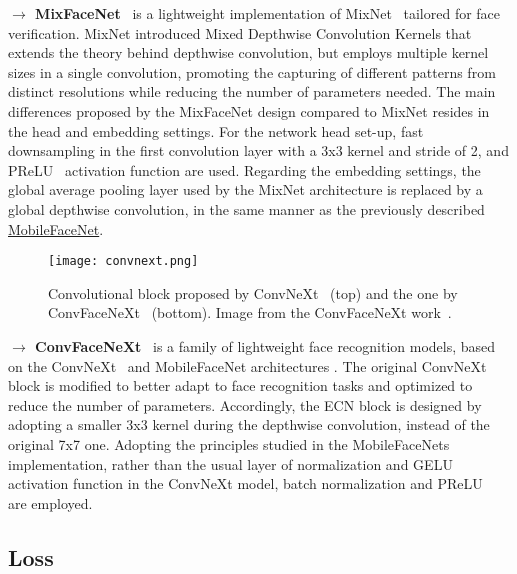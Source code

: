 \documentclass[class=report, crop=false, a4paper, 12pt]{standalone}
\begin{document}
\noindent\textbf{$\rightarrow$ MixFaceNet}~\autocite{boutrosMixFaceNetsExtremelyEfficient2021} is a lightweight implementation of MixNet~\autocite{tanMixConvMixedDepthwise} tailored for face verification. MixNet introduced Mixed Depthwise Convolution Kernels  that extends the theory behind depthwise convolution, but employs multiple kernel sizes in a single convolution, promoting the capturing of different patterns from distinct resolutions while reducing the number of parameters needed. The main differences proposed by the MixFaceNet design compared to MixNet resides in the head and embedding settings. For the network head set-up, fast downsampling in the first convolution layer with a 3x3 kernel and stride of 2, and PReLU~\autocite{heDelvingDeepRectifiers2015} activation function are used. Regarding the embedding settings, the global average pooling layer used by the MixNet architecture is replaced by a global depthwise convolution, in the same manner as the previously described \hyperref[mobilefacenet]{MobileFaceNet}.

\begin{figure}[H]
    \centering
    \texttt{[image: convnext.png]}
    \caption[Convolutional block proposed by ConvNeXt and the one by ConvFaceNeXt.]{Convolutional block proposed by ConvNeXt~\autocite{liuConvNet2020s2022} (top) and the one by ConvFaceNeXt~\autocite{hooConvFaceNeXtLightweightNetworks2022} (bottom). Image from the ConvFaceNeXt work~\autocite{hooConvFaceNeXtLightweightNetworks2022}.}
    \label{fig:convnext}
\end{figure}

\noindent\textbf{$\rightarrow$ ConvFaceNeXt}~\autocite{hooConvFaceNeXtLightweightNetworks2022} is a family of lightweight face recognition models, based on the ConvNeXt~\autocite{liuConvNet2020s2022} and MobileFaceNet architectures . The original ConvNeXt block is modified to better adapt to face recognition tasks and optimized to reduce the number of parameters. Accordingly, the \gls{ECN} block is designed by adopting a smaller 3x3 kernel during the depthwise convolution, instead of the original 7x7 one. Adopting the principles studied in the MobileFaceNets implementation, rather than the usual layer of normalization and \gls{GELU} activation function in the ConvNeXt model, batch normalization and PReLU~\autocite{heDelvingDeepRectifiers2015} are employed. 

\subsection{Loss}
\end{document}
